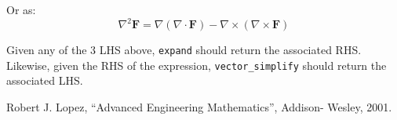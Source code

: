 \documentclass[12pt, titlepage]{article}
\newcommand{\code}[1]{\texttt{#1}}
\begin{document}
	Or as:
	\[
	\nabla ^{2}{\mathbf{F}} = \nabla (\nabla \cdot {\mathbf{F}}) - \nabla \times \left(\nabla \times {\mathbf{F}}\right)
	\]
	 
	Given any of the 3 LHS above, \code{expand} should return the associated RHS.  Likewise, given the RHS of the expression, \code{vector\_simplify} should return the associated LHS.
	
	\begin{thebibliography}{99}
		 Robert J. Lopez, ``Advanced Engineering Mathematics'', Addison- Wesley, 2001. 
	\end{thebibliography}
	
	
\end{document}

